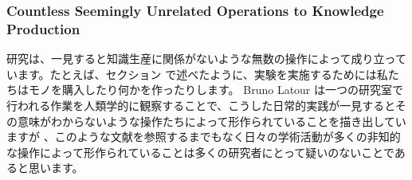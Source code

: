 



\subsubsection{Countless Seemingly Unrelated Operations to Knowledge Production}
研究は、一見すると知識生産に関係がないような無数の操作によって成り立っています。たとえば、セクション \label{section-experimentation} で述べたように、実験を実施するためには私たちはモノを購入したり何かを作ったりします。 Bruno Latour は一つの研究室で行われる作業を人類学的に観察することで、こうした日常的実践が一見するとその意味がわからないような操作たちによって形作られていることを描き出していますが \cite{latour1987science}、このような文献を参照するまでもなく日々の学術活動が多くの非知的な操作によって形作られていることは多くの研究者にとって疑いのないことであると思います。

